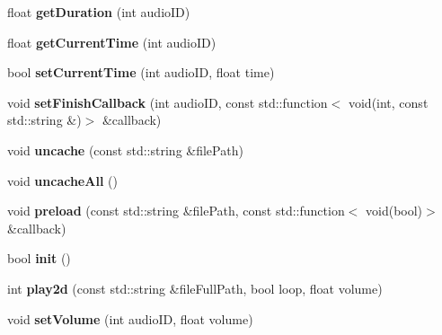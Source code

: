 \begin{DoxyCompactItemize}
float {\bfseries get\+Duration} (int audio\+ID)
\item 
\mbox{\label{classexperimental_1_1AudioEngineImpl_a47be5365efeebd307e3891f3f71386f0}} 
float {\bfseries get\+Current\+Time} (int audio\+ID)
\item 
\mbox{\label{classexperimental_1_1AudioEngineImpl_a8abd3b8330fb7ca7f513016055333f9c}} 
bool {\bfseries set\+Current\+Time} (int audio\+ID, float time)
\item 
\mbox{\label{classexperimental_1_1AudioEngineImpl_ab4bc0ee1754fda9638d7d0c4470cf170}} 
void {\bfseries set\+Finish\+Callback} (int audio\+ID, const std\+::function$<$ void(int, const std\+::string \&)$>$ \&callback)
\item 
\mbox{\label{classexperimental_1_1AudioEngineImpl_a4ad8d3d499bf3e5fd262d710b215891e}} 
void {\bfseries uncache} (const std\+::string \&file\+Path)
\item 
\mbox{\label{classexperimental_1_1AudioEngineImpl_ae439dacc5acebf311686ebf6f1f6b3df}} 
void {\bfseries uncache\+All} ()
\item 
\mbox{\label{classexperimental_1_1AudioEngineImpl_a595eb65c12c8546732ac085b44a59075}} 
void {\bfseries preload} (const std\+::string \&file\+Path, const std\+::function$<$ void(bool)$>$ \&callback)
\item 
\mbox{\label{classexperimental_1_1AudioEngineImpl_a908e5136201a8a6b53ae5c292329f82b}} 
bool {\bfseries init} ()
\item 
\mbox{\label{classexperimental_1_1AudioEngineImpl_a04b788a8319f5d7f90e297a2a345f745}} 
int {\bfseries play2d} (const std\+::string \&file\+Full\+Path, bool loop, float volume)
\item 
\mbox{\label{classexperimental_1_1AudioEngineImpl_aaa11ae7fe8bfd4c4365c02aa71f119b0}} 
void {\bfseries set\+Volume} (int audio\+ID, float volume)

\end{DoxyCompactItemize}
